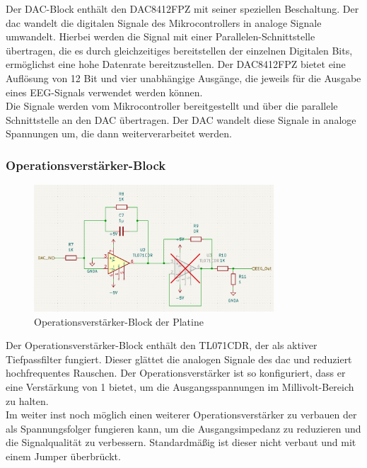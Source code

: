 Der DAC-Block enthält den DAC8412FPZ mit seiner speziellen Beschaltung.
Der \gls{dac} wandelt die digitalen Signale des Mikrocontrollers in analoge Signale umwandelt. Hierbei werden die Signal mit einer Parallelen-Schnittstelle übertragen, die es durch gleichzeitiges bereitstellen der einzelnen Digitalen Bits, ermöglichst eine hohe Datenrate bereitzustellen. Der DAC8412FPZ bietet eine Auflösung von 12 Bit und vier unabhängige Ausgänge, die jeweils für die Ausgabe eines EEG-Signals verwendet werden können.\\
Die Signale werden vom Mikrocontroller bereitgestellt und über die parallele Schnittstelle an den DAC übertragen. Der DAC wandelt diese Signale in analoge Spannungen um, die dann weiterverarbeitet werden.\\

\subsubsection{Operationsverstärker-Block}
\begin{figure}[H]
    \centering
    \includegraphics[width=0.8\textwidth]{bilder/Operationsverstaerker_Block.png}
    \caption{Operationsverstärker-Block der Platine}
    \label{fig:operationsverstaerker_block}
\end{figure}

Der Operationsverstärker-Block enthält den TL071CDR, der als aktiver Tiefpassfilter fungiert. Dieser glättet die analogen Signale des \gls{dac} und reduziert hochfrequentes Rauschen. Der Operationsverstärker ist so konfiguriert, dass er eine Verstärkung von 1 bietet, um die Ausgangsspannungen im Millivolt-Bereich zu halten.\\
Im weiter inst noch möglich einen weiterer Operationsverstärker zu verbauen der als Spannungsfolger fungieren kann, um die Ausgangsimpedanz zu reduzieren und die Signalqualität zu verbessern. Standardmäßig ist dieser nicht verbaut und mit einem Jumper überbrückt. 

